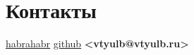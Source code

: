 \documentclass[a4paper, 8pt]{article}
\begin{document}

\section{Контакты}{
    \href{http://habrahabr.ru/users/vtyulb/}{habrahabr} \newline
    \href{https://github.com/vtyulb}{github} \newline
    \textbf{<vtyulb@vtyulb.ru>}
}
\end{document}
